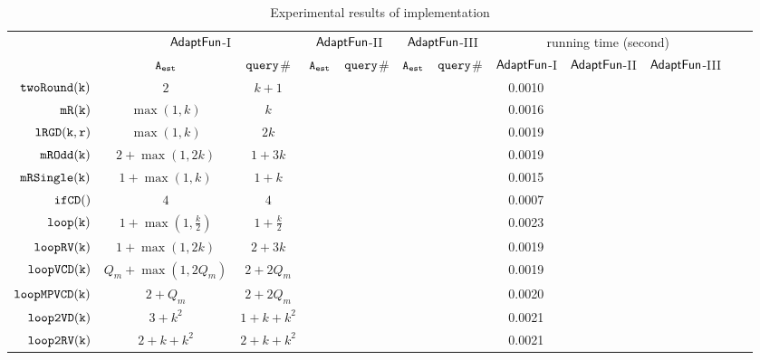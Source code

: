 {\footnotesize
\begin {table}[H]
\vspace{-0.4cm}
    \caption{Experimental results of {\THESYSTEM} implementation}
    \vspace{-0.5cm}
        \label{tb:adapt-imp-alternatives}
        \begin{center}
        \centering
{\tiny
        \begin{tabular}{ | >{\tiny}r | c | c | c | c | c | c | c | c | c | c | c |}
        \hline \hline
        \multirow{2}{*}{Program $c$}
         & \multicolumn{2}{c|}{$\textsf{AdaptFun}$-I}
         & \multicolumn{2}{c|}{$\textsf{AdaptFun}$-II}
         & \multicolumn{2}{c|}{$\textsf{AdaptFun}$-III}
         & \multicolumn{3}{c|}{running time (second)} \\ 
         \cline{2-8}
         & {${\mathtt{A_{est}}}$ } & {${\tt query}$\# } & {${\mathtt{A_{est}}}$ } & {${\tt query}$\# } & {${\mathtt{A_{est}}}$ } & {${\tt query}$\# } & $\textsf{AdaptFun}$-I & $\textsf{AdaptFun}$-II & $\textsf{AdaptFun}$-III \\ 
         \cline{5-10}
         \hline \hline
         $  \mathtt{twoRound(k)}$ &  $2$    & $k+1 $  & & & & & 0.0010 &  &  \\
         $  \mathtt{mR(k)}$ &   $\max(1,k)$ & $k$  &  & & & & 0.0016 & & \\
         $  \mathtt{lRGD(k, r)}$ & $\max(1,k) $ & $ 2k $  &  & & & & 0.0019 & &  \\
         $  \mathtt{mROdd(k)}$  &  $2+\max(1,2k)  $ & $1 + 3 k  $  &  & & & & 0.0019 & &\\
         $  \mathtt{mRSingle(k)}$    & $1+ \max(1, k) $ & $1 + k$  &  & & & & 0.0015 & & \\
         $  \mathtt{ifCD()}$   & $4$ &   $4$  & & & & & 0.0007 & & \\
         $  \mathtt{loop(k)}$ &    $1 + \max(1, \frac{k}{2}) $  &  $1+\frac{k}{2} $ & & & & & 0.0023 &  & \\
         $  \mathtt{loopRV(k)}$   &  $ 1 + \max(1,2k)$ & $2 + 3 k$  &  & & & & 0.0019 & & \\
         $  {\mathtt{loopVCD(k)}} $  &  ${Q_m+\max(1,2Q_m)}$  & $2+2Q_m$   &  & & & & 0.0019 & \\
         $ {\mathtt{loopMPVCD(k)}}$  &  $2 + Q_m$  & $2+2Q_m$   &   & & & & 0.0020 & & \\
         $  \mathtt{loop2VD(k)}$  &   $3 + k^2$ & $1 + k + k^2$   &  & & & & 0.0021 & & \\
         $  \mathtt{loop2RV(k)}$  &  $ 2 + k +  k^2 $    &  $2 + k + k^2$   &  & & & & 0.0021 & & \\

\end{tabular}}
\end{center}
\end{table}}
